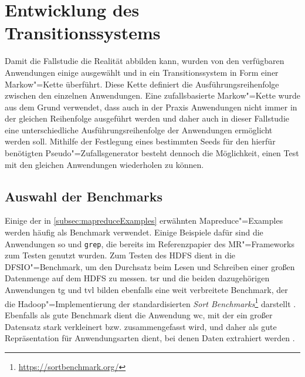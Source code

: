 \section{Entwicklung des Transitionssystems}
\label{sec:transitionsystem}

Damit die Fallstudie die Realität abbilden kann, wurden von den verfügbaren Anwendungen einige ausgewählt und in ein Transitionssystem in Form einer Markow"=Kette überführt.
Diese Kette definiert die Ausführungsreihenfolge zwischen den einzelnen Anwendungen.
Eine zufallsbasierte Markow"=Kette wurde aus dem Grund verwendet, dass auch in der Praxis Anwendungen nicht immer in der gleichen Reihenfolge ausgeführt werden und daher auch in dieser Fallstudie eine unterschiedliche Ausführungsreihenfolge der Anwendungen ermöglicht werden soll.
Mithilfe der Festlegung eines bestimmten Seeds für den hierfür benötigten Pseudo"=Zufallsgenerator besteht dennoch die Möglichkeit, einen Test mit den gleichen Anwendungen wiederholen zu können.

\subsection{Auswahl der Benchmarks}
\label{subsec:appSelection}

Einige der in \cref{subsec:mapreduceExamples} erwähnten Mapreduce"=Examples werden häufig als Benchmark verwendet.
Einige Beispiele dafür sind die Anwendungen \acrlong{so} und \texttt{grep}, die bereits im Referenzpapier \cite{Dean2004} des \gls{MR}"=Frameworks zum Testen genutzt wurden.
Zum Testen des HDFS dient in \cite{Shvachko2010} die DFSIO"=Benchmark, um den Durchsatz beim Lesen und Schreiben einer großen Datenmenge auf dem HDFS zu messen.
\acrlong{tsr} und die beiden dazugehörigen Anwendungen \acrlong{tg} und \acrlong{tvl} bilden ebenfalls eine weit verbreitete Benchmark, der die Hadoop"=Implementierung der standardisierten \emph{Sort Benchmarks}\footnote{\url{https://sortbenchmark.org/}} darstellt \cite{Graves2013}.
Ebenfalls als gute Benchmark dient die Anwendung \acrlong{wc}, mit der ein großer Datensatz stark verkleinert bzw. zusammengefasst wird, und daher als gute Repräsentation für Anwendungsarten dient, bei denen Daten extrahiert werden \cite{Huang2010,Chen2012}.

